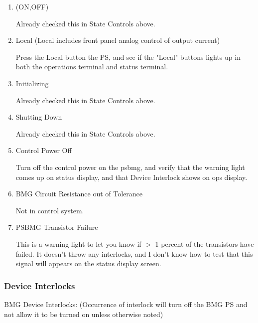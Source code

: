 \documentclass[11pt]{book}		%
\begin{document}
\begin{enumerate}
 \item (ON,OFF)

\color{red}
Already checked this in State Controls above.
\color{black}

 \item Local (Local includes front panel analog control of output current)

\color{red}
Press the Local button the PS, and see if the "Local" buttons lights up in both the operations terminal and status terminal.
\color{black}

 \item Initializing

\color{red}
Already checked this in State Controls above.
\color{black}

 \item Shutting Down

\color{red}
Already checked this in State Controls above.
\color{black}

 \item Control Power Off

\color{red}
Turn off the control power on the psbmg, and verify that the warning light comes up on status display, and that Device Interlock shows on ops display.
\color{black}

 \item BMG Circuit Resistance out of Tolerance

\color{red}
Not in control system.
\color{black}

 \item PSBMG Transistor Failure

\color{red}
This is a warning light to let you know if $>$ 1 percent of the transistors have failed. It doesn't throw any interlocks, and I don't know how to test that this signal will appears on the status display screen.
\color{black}


\end{enumerate}

\subsubsection{Device Interlocks}

BMG Device Interlocks:
(Occurrence of interlock will turn off the BMG PS and not allow it to be turned on unless otherwise noted)
\end{document}

